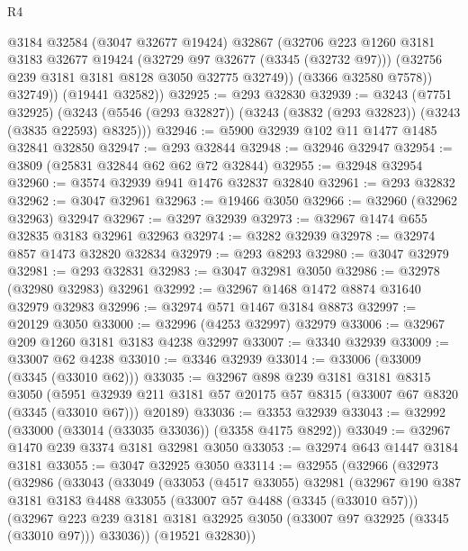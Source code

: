 \begin{lexlean}{R4}
\begin{coremodule}
            @3184
            @32584
            (@3047 @32677 @19424)
            @32867
            (@32706
              @223
              @1260
              @3181
              @3183
              @32677
              @19424
              (@32729 @97 @32677 (@3345 (@32732 @97)))
              (@32756 @239 @3181 @3181 @8128 @3050 @32775 @32749))
            (@3366 @32580 @7578))
          @32749))
      (@19441 @32582))
@32925 := @293 @32830
@32939 := @3243
    (@7751 @32925)
    (@3243 (@5546 (@293 @32827)) (@3243 (@3832 (@293 @32823)) (@3243 (@3835 @22593) @8325)))
@32946 := @5900 @32939 @102 @11 @1477 @1485 @32841 @32850
@32947 := @293 @32844
@32948 := @32946 @32947
@32954 := @3809 (@25831 @32844 @62 @62 @72 @32844)
@32955 := @32948 @32954
@32960 := @3574 @32939 @941 @1476 @32837 @32840
@32961 := @293 @32832
@32962 := @3047 @32961
@32963 := @19466 @3050
@32966 := @32960 (@32962 @32963) @32947
@32967 := @3297 @32939
@32973 := @32967 @1474 @655 @32835 @3183 @32961 @32963
@32974 := @3282 @32939
@32978 := @32974 @857 @1473 @32820 @32834
@32979 := @293 @8293
@32980 := @3047 @32979
@32981 := @293 @32831
@32983 := @3047 @32981 @3050
@32986 := @32978 (@32980 @32983) @32961
@32992 := @32967 @1468 @1472 @8874 @31640 @32979 @32983
@32996 := @32974 @571 @1467 @3184 @8873
@32997 := @20129 @3050
@33000 := @32996 (@4253 @32997) @32979
@33006 := @32967 @209 @1260 @3181 @3183 @4238 @32997
@33007 := @3340 @32939
@33009 := @33007 @62 @4238
@33010 := @3346 @32939
@33014 := @33006 (@33009 (@3345 (@33010 @62)))
@33035 := @32967
    @898
    @239
    @3181
    @3181
    @8315
    @3050
    (@5951 @32939 @211 @3181 @57 @20175 @57 @8315 (@33007 @67 @8320 (@3345 (@33010 @67))) @20189)
@33036 := @3353 @32939
@33043 := @32992 (@33000 (@33014 (@33035 @33036)) (@3358 @4175 @8292))
@33049 := @32967 @1470 @239 @3374 @3181 @32981 @3050
@33053 := @32974 @643 @1447 @3184 @3181
@33055 := @3047 @32925 @3050
@33114 := @32955
    (@32966
      (@32973
        (@32986
          (@33043
            (@33049
              (@33053
                (@4517 @33055)
                @32981
                (@32967
                  @190
                  @387
                  @3181
                  @3183
                  @4488
                  @33055
                  (@33007 @57 @4488 (@3345 (@33010 @57)))
                  (@32967
                    @223
                    @239
                    @3181
                    @3181
                    @32925
                    @3050
                    (@33007 @97 @32925 (@3345 (@33010 @97)))
                    @33036))
                (@19521 @32830))

\end{coremodule}
\end{lexlean}
